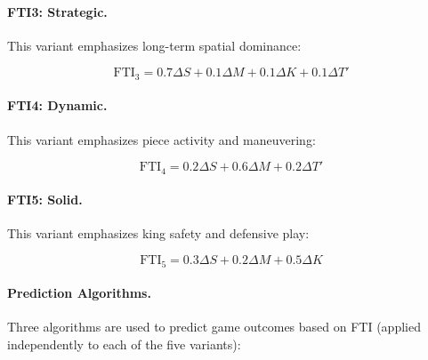 \documentclass[11pt]{book}
\begin{document}
\paragraph{FTI3: Strategic.} This variant emphasizes long-term spatial dominance:

\begin{equation}
\text{FTI}_3 = 0.7 \Delta S + 0.1 \Delta M + 0.1 \Delta K + 0.1 \Delta T'
\end{equation}

\paragraph{FTI4: Dynamic.} This variant emphasizes piece activity and maneuvering:

\begin{equation}
\text{FTI}_4 = 0.2 \Delta S + 0.6 \Delta M + 0.2 \Delta T'
\end{equation}

\paragraph{FTI5: Solid.} This variant emphasizes king safety and defensive play:

\begin{equation}
\text{FTI}_5 = 0.3 \Delta S + 0.2 \Delta M + 0.5 \Delta K
\end{equation}

\paragraph{Prediction Algorithms.} Three algorithms are used to predict game outcomes based on FTI (applied independently to each of the five variants):
\end{document}
